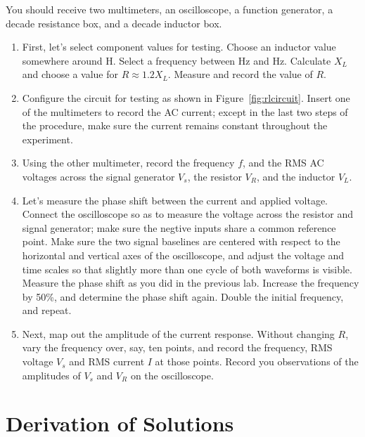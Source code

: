 \documentclass[12pt]{article}
\begin{document}
You should receive two multimeters, an oscilloscope, a function
generator, a decade resistance box, and a decade inductor box.

\begin{enumerate}
\item First, let's select component values for testing.  Choose an
  inductor value somewhere around \unit[7]{H}.  Select a frequency
  between \unit[300]{Hz} and \unit[600]{Hz}.  Calculate $X_L$ and
  choose a value for $R \approx 1.2 X_L$.  Measure and record the
  value of $R$.
\item Configure the circuit for testing as shown in
  Figure~\ref{fig:rlcircuit}.  Insert one of the multimeters to record
  the AC current; except in the last two steps of the procedure, make
  sure the current remains constant throughout the experiment.
\item Using the other multimeter, record the frequency $f$, and the
  RMS AC voltages across the signal generator $V_s$, the resistor
  $V_R$, and the inductor $V_L$.
\item \label{item:phase} Let's measure the phase shift between the
  current and applied voltage.  Connect the oscilloscope so as to
  measure the voltage across the resistor and signal generator; make
  sure the negtive inputs share a common reference point.  Make sure
  the two signal baselines are centered with respect to the horizontal
  and vertical axes of the oscilloscope, and adjust the voltage and
  time scales so that slightly more than one cycle of both waveforms
  is visible.  Measure the phase shift as you did in the previous lab.
  Increase the frequency by 50\%, and determine the phase shift again.
  Double the initial frequency, and repeat.
\item \label{item:current} Next, map out the amplitude of the current
  response.  Without changing $R$, vary the frequency over, say, ten
  points, and record the frequency, RMS voltage $V_s$ and RMS current
  $I$ at those points.  Record you observations of the amplitudes of
  $V_s$ and $V_R$ on the oscilloscope.
\end{enumerate}


\appendix

\section{Derivation of Solutions}
\label{sec:solutions}
\end{document}
